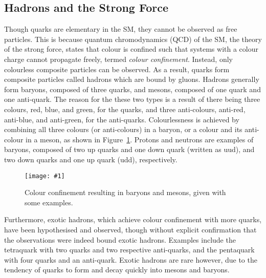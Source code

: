 \documentclass[twocolumn]{article}
\newcommand{\insertFigure}[1]{%
   \texttt{[image: \#1]}%
}
\begin{document}
\subsection{Hadrons and the Strong Force}
Though quarks are elementary in the SM, they cannot be observed as free particles. This is because quantum chromodynamics (QCD) of the SM, the theory of the strong force, states that colour is confined such that systems with a colour charge cannot propagate freely, termed \textit{colour confinement}. Instead, only colourless composite particles can be observed. As a result, quarks form composite particles called hadrons which are bound by gluons. Hadrons generally form baryons, composed of three quarks, and mesons, composed of one quark and one anti-quark. The reason for the these two types is a result of there being three colours, red, blue, and green, for the quarks, and three anti-colours, anti-red, anti-blue, and anti-green, for the anti-quarks. Colourlessness is achieved by combining all three colours (or anti-colours) in a baryon, or a colour and its anti-colour in a meson, as shown in Figure~\ref{fig:colour}. Protons and neutrons are examples of baryons, composed of two up quarks and one down quark (written as uud), and two down quarks and one up quark (udd), respectively.
\begin{figure}[!h]
	\centering
	\insertFigure{colour.png}
	\caption{Colour confinement resulting in baryons and mesons, given with some examples.~\cite{colour}}
	\label{fig:colour}
\end{figure}
Furthermore, exotic hadrons, which achieve colour confinement with more quarks, have been hypothesised and observed, though without explicit confirmation that the observations were indeed bound exotic hadrons. Examples include the tetraquark with two quarks and two respective anti-quarks, and the pentaquark with four quarks and an anti-quark. Exotic hadrons are rare however, due to the tendency of quarks to form and decay quickly into mesons and baryons.
\end{document}
